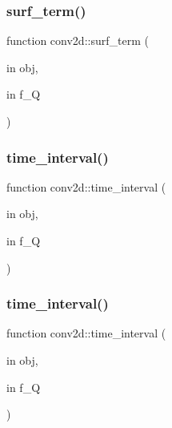 \mbox{\label{classconv2d_a0a29acf2442a81ecb667b86485c1950f}} 
\subsubsection{\texorpdfstring{surf\+\_\+term()}{surf\_term()}}
{\footnotesize\ttfamily function conv2d\+::surf\+\_\+term (\begin{DoxyParamCaption}\item[{in}]{obj,  }\item[{in}]{f\+\_\+Q }\end{DoxyParamCaption})}

\mbox{\label{classconv2d_a84d8086afe6f762cb80dbb4ea1e021d7}} 
\subsubsection{\texorpdfstring{time\+\_\+interval()}{time\_interval()}\hspace{0.1cm}{\footnotesize\ttfamily [1/2]}}
{\footnotesize\ttfamily function conv2d\+::time\+\_\+interval (\begin{DoxyParamCaption}\item[{in}]{obj,  }\item[{in}]{f\+\_\+Q }\end{DoxyParamCaption})}

\mbox{\label{classconv2d_a84d8086afe6f762cb80dbb4ea1e021d7}} 
\subsubsection{\texorpdfstring{time\+\_\+interval()}{time\_interval()}\hspace{0.1cm}{\footnotesize\ttfamily [2/2]}}
{\footnotesize\ttfamily function conv2d\+::time\+\_\+interval (\begin{DoxyParamCaption}\item[{in}]{obj,  }\item[{in}]{f\+\_\+Q }\end{DoxyParamCaption})}



